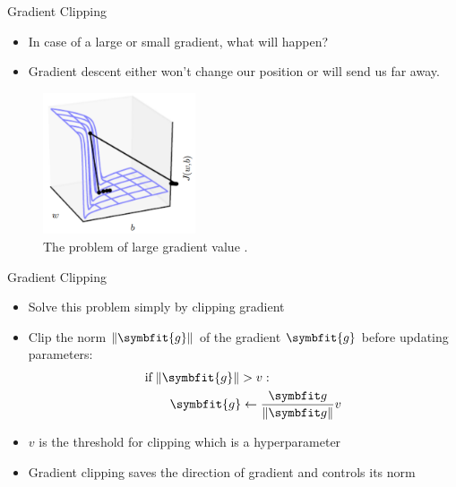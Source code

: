 \begin{frame}{Gradient Clipping}
    \begin{itemize}
        \item In case of a large or small gradient, what will happen?
        \pause
        \item Gradient descent either {\color{red} won't change our position} or will {\color{red} send us far away}.
    \end{itemize}
	\begin{figure}[H]
		\centering
		\includegraphics[width=0.4\textwidth]{Images/gard-clipping-1.png}
		\caption{The problem of large gradient value \cite{Goodfellow-et-al-2016}.}
	\end{figure}
\end{frame}

\begin{frame}{Gradient Clipping}
	\begin{itemize}
		\item Solve this problem simply by clipping gradient
		\item Clip the norm $\|\symbfit{g}\|$ of the gradient $\symbfit{g}$ before updating parameters:
		\[
		\begin{aligned}
			&\text{if} \; \|\symbfit{g}\| > v:\\
			&\qquad \symbfit{g} \gets \frac{\symbfit g}{\|\symbfit g\|} v
		\end{aligned}
		\]
		\item $v$ is the threshold for clipping which is a hyperparameter
		\item Gradient clipping saves the direction of gradient and controls its norm
	\end{itemize}
\end{frame}


